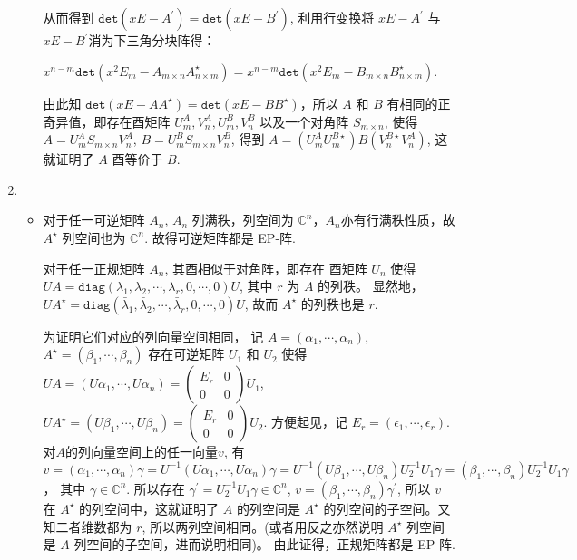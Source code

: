 \documentclass{article}
\begin{document}
\begin{spacing}{1.5}
\begin{enumerate}
\begin{itemize}
            从而得到 $\mathtt{det}(xE - A^\prime) = \mathtt{det}(xE - B^\prime)$, 利用行变换将 $xE - A^\prime$ 与 $xE-B^\prime$消为下三角分块阵得： 

            $x^{n-m}\mathtt{det}(x^2E_m - A_{m\times n}A^\star_{n\times m}) = x^{n-m}\mathtt{det}(x^2E_m - B_{m\times n}B^\star_{n\times m})$.
            
            由此知 $\mathtt{det}(xE - AA^\star) = \mathtt{det}(xE - BB^\star)$，所以 $A$ 和 $B$ 有相同的正奇异值，即存在酉矩阵 $U^A_m, V^A_n, U^B_m, V^B_n$ 以及一个对角阵 $S_{m\times n}$, 使得 
            $A = U^A_mS_{m\times n}V^A_n$, $B = U^B_mS_{m\times n}V^B_n$, 得到 $A = (U^A_mU^{B\star}_m)B(V^{B\star}_nV^A_n)$, 这就证明了 $A$ 酉等价于 $B$.

        \end{itemize}

        \item [2.5 习题3]
        
        \begin{itemize}
            \item [(1)] 对于任一可逆矩阵 $A_n$, $A_n$ 列满秩，列空间为 $\mathbb{C}^n$，$A_n$亦有行满秩性质，故 $A^\star$ 列空间也为 $\mathbb{C}^n$. 故得可逆矩阵都是 EP-阵.
        
                        对于任一正规矩阵 $A_n$, 其酉相似于对角阵，即存在 酉矩阵 $U_n$ 使得 $UA = \mathtt{diag}(\lambda_1, \lambda_2,\cdots, \lambda_r, 0, \cdots, 0)U$, 其中 $r$ 为 $A$ 的列秩。
                        显然地，$UA^\star = \mathtt{diag}(\bar\lambda_1,\bar\lambda_2, \cdots, \bar\lambda_r, 0, \cdots, 0)U$, 故而 $A^\star$ 的列秩也是 $r$. 
                        
                        为证明它们对应的列向量空间相同，
                        记 $A = (\alpha_1, \cdots, \alpha_n)$, $A^\star = (\beta_1, \cdots, \beta_n)$ 存在可逆矩阵 $U_1$ 和 $U_2$ 使得 $UA = (U\alpha_1,\cdots,U\alpha_n) = \left(\begin{array}{cc}E_r&0\\0&0\end{array}\right)U_1$, 
                        $UA^\star = (U\beta_1,\cdots, U\beta_n) = \left(\begin{array}{cc}E_r&0\\0&0\end{array}\right)U_2$. 方便起见，记 $E_r = (\epsilon_1, \cdots, \epsilon_r)$. 
                        对$A$的列向量空间上的任一向量$v$, 有 
                        $$v = (\alpha_1, \cdots, \alpha_n) \gamma = U^{-1}(U\alpha_1, \cdots, U\alpha_n)\gamma = U^{-1} (U\beta_1, \cdots, U\beta_n)U_2^{-1}U_1\gamma = (\beta_1, \cdots, \beta_n)U_2^{-1}U_1\gamma$$， 其中 $\gamma \in\mathbb{C}^n$.
                        所以存在 $\gamma^\prime = U_2^{-1}U_1\gamma\in\mathbb{C}^n$, $v = (\beta_1, \cdots, \beta_n) \gamma^\prime$, 所以 $v$ 在 $A^\star$ 的列空间中，这就证明了 $A$ 的列空间是 $A^\star$ 的列空间的子空间。又知二者维数都为 $r$, 所以两列空间相同。(或者用反之亦然说明 $A^\star$ 列空间是 $A$ 列空间的子空间，进而说明相同)。
                        由此证得，正规矩阵都是 EP-阵.


\end{itemize}
\end{enumerate}
\end{spacing}
\end{document}
